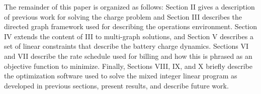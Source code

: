 \par The remainder of this paper is organized as follows: Section II gives a description of previous work for solving the charge problem and Section III describes the directed graph framework used for describing the operations environment.  Section IV extends the content of III to multi-graph solutions, and Section V describes a set of linear constraints that describe the battery charge dynamics.  Sections VI and VII describe the rate schedule used for billing and how this is phrased as an objective function to minimize. Finally, Sections VIII, IX, and X briefly describe the optimization software used to solve the mixed integer linear program as developed in previous sections, present results, and describe future work.
